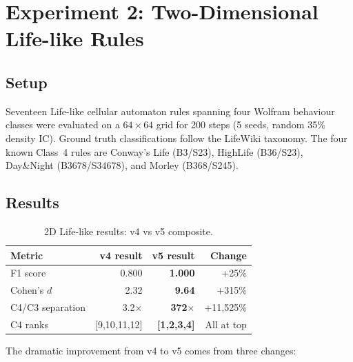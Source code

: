 \documentclass[12pt,a4paper]{article}
\begin{document}
\section{Experiment 2: Two-Dimensional Life-like Rules}

\subsection{Setup}

Seventeen Life-like cellular automaton rules spanning four Wolfram
behaviour classes were evaluated on a $64\times64$ grid for 200 steps
(5 seeds, random 35\% density IC).
Ground truth classifications follow the LifeWiki taxonomy.
The four known Class~4 rules are Conway's Life (B3/S23),
HighLife (B36/S23), Day\&Night (B3678/S34678), and
Morley (B368/S245).

\subsection{Results}

\begin{table}[h]
\centering
\caption{2D Life-like results: v4 vs v5 composite.}
\begin{tabular}{lrrr}
\toprule
Metric & v4 result & v5 result & Change \\
\midrule
F1 score         & 0.800 & \textbf{1.000} & +25\% \\
Cohen's $d$      & 2.32  & \textbf{9.64}  & +315\% \\
C4/C3 separation & 3.2$\times$ & \textbf{372$\times$} & +11,525\% \\
C4 ranks         & [9,10,11,12] & \textbf{[1,2,3,4]} & All at top \\
\bottomrule
\end{tabular}
\end{table}

The dramatic improvement from v4 to v5 comes from three changes:
\end{document}
